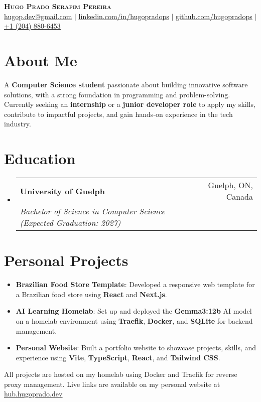 \documentclass[letterpaper,11pt]{article}
\makeatletter
\newcommand{\resumeItem}[2]{
  \item\small{
    \textbf{#1}{: #2}
  }
}
\newcommand{\resumeSubheading}[4]{
  \vspace{-1pt}\item
    \begin{tabular*}{0.97\textwidth}[t]{l@{\extracolsep{\fill}}r}
      \textbf{#1} & #2 \\
      \textit{\small#3} & \textit{\small#4} \\
    \end{tabular*}
}
\newcommand{\resumeSubItem}[2]{\resumeItem{#1}{#2}}
\newcommand{\resumeSubHeadingListStart}{\begin{itemize}[leftmargin=*]}
\newcommand{\resumeSubHeadingListEnd}{\end{itemize}}
\makeatother
\begin{document}
\begin{center}
  \textbf{\color{myblue} \Huge \scshape Hugo Prado Serafim Pereira} \\ \vspace{1pt}
  \small \href{mailto:hugop.dev@gmail.com}{\underline{hugop.dev@gmail.com}} $|$ 
  \href{https://www.linkedin.com/in/hugopradops/}{\underline{linkedin.com/in/hugopradops}} $|$
  \href{https://github.com/hugopradops}{\underline{github.com/hugopradops}} $|$
  \href{tel:+12048806453}{\underline{+1 (204) 880-6453}}
\end{center}

\section{About Me}
  A \textbf{Computer Science student} passionate about building innovative software solutions, with a strong foundation in programming and problem-solving. Currently seeking an \textbf{internship} or a \textbf{junior developer role} to apply my skills, contribute to impactful projects, and gain hands-on experience in the tech industry.

\section{Education}
  \resumeSubHeadingListStart
    \resumeSubheading
      {University of Guelph}{Guelph, ON, Canada}
      {Bachelor of Science in Computer Science (Expected Graduation: 2027)}{}
  \resumeSubHeadingListEnd

\section{Personal Projects}
  \resumeSubHeadingListStart
    \resumeSubItem{Brazilian Food Store Template}{Developed a responsive web template for a Brazilian food store using \textbf{React} and \textbf{Next.js}.}
    \resumeSubItem{AI Learning Homelab}{Set up and deployed the \textbf{Gemma3:12b} AI model on a homelab environment using \textbf{Traefik}, \textbf{Docker}, and \textbf{SQLite} for backend management.}
    \resumeSubItem{Personal Website}{Built a portfolio website to showcase projects, skills, and experience using \textbf{Vite}, \textbf{TypeScript}, \textbf{React}, and \textbf{Tailwind CSS}.}
  \resumeSubHeadingListEnd
  All projects are hosted on my homelab using Docker and Traefik for reverse proxy management. Live links are available on my personal website at \href{https://hub.hugoprado.dev/}{\underline{hub.hugoprado.dev}}
\end{document}
